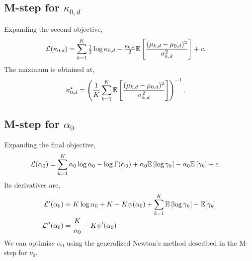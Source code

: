 \subsection{M-step for \texorpdfstring{$\kappa_{0,d}$}{κ₀}}
Expanding the second objective,
\begin{align*}
    \mathcal{L}(\kappa_{0,d}) &= \sum_{k=1}^K \tfrac{1}{2} \log \kappa_{0,d} - \tfrac{\kappa_{0,d}}{2} \mathbb{E} \left[\frac{(\mu_{k,d} - \mu_{0,d})^2}{\sigma_{k,d}^2}\right] + c.
\end{align*}
The maximum is obtained at,
\begin{align*}
    \kappa_{0,d}^\star &= \left(\frac{1}{K} \sum_{k=1}^K \mathbb{E} \left[\frac{(\mu_{k,d} - \mu_{0,d})^2}{\sigma_{k,d}^2}\right]\right)^{-1}.
\end{align*}

\subsection{M-step for \texorpdfstring{$\alpha_0$}{α₀}}
Expanding the final objective,
\begin{align*}
    \mathcal{L}(\alpha_0) &= \sum_{k=1}^K \alpha_0 \log \alpha_0 - \log \Gamma(\alpha_0) + \alpha_0 \mathbb{E}\left[ \log \gamma_k \right]- \alpha_0 \mathbb{E}\left[\gamma_k\right] + c.
\end{align*}
Its derivatives are,
\begin{align*}
    \mathcal{L}'(\alpha_0) &= K\log \alpha_0 + K - K\psi(\alpha_0) + \sum_{k=1}^K \mathbb{E}\left[\log \gamma_k\right] - \mathbb{E} [\gamma_k] \\
    \mathcal{L}''(\alpha_0) &= \frac{K}{\alpha_0} - K\psi'(\alpha_0)
\end{align*}
We can optimize $\alpha_0$ using the generalized Newton's method described in the M-step for $\nu_0$.

